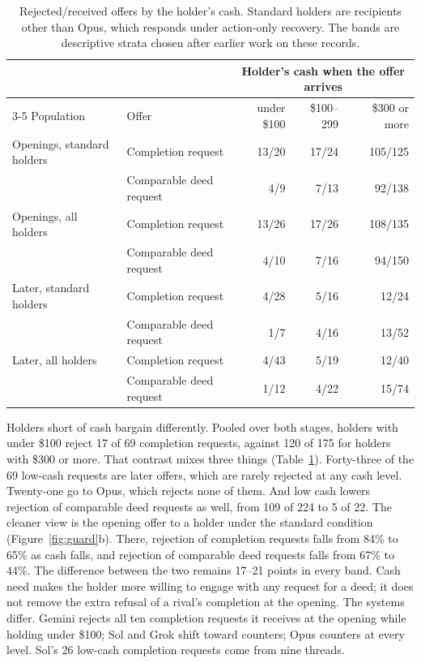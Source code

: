 \documentclass[11pt,letterpaper]{article}
\begin{document}
\begin{table}[t]
\centering\small
\begin{tabular}{@{}llrrr@{}}
\toprule
& & \multicolumn{3}{c}{Holder's cash when the offer arrives}\\
\cmidrule(l){3-5}
Population & Offer & under \$100 & \$100--299 & \$300 or more\\
\midrule
Openings, standard holders & Completion request & 13/20 & 17/24 & 105/125\\
& Comparable deed request & 4/9 & 7/13 & 92/138\\
Openings, all holders & Completion request & 13/26 & 17/26 & 108/135\\
& Comparable deed request & 4/10 & 7/16 & 94/150\\
\addlinespace
Later, standard holders & Completion request & 4/28 & 5/16 & 12/24\\
& Comparable deed request & 1/7 & 4/16 & 13/52\\
Later, all holders & Completion request & 4/43 & 5/19 & 12/40\\
& Comparable deed request & 1/12 & 4/22 & 15/74\\
\bottomrule
\end{tabular}
\caption{Rejected/received offers by the holder's cash. Standard holders are recipients other than Opus, which responds under action-only recovery. The bands are descriptive strata chosen after earlier work on these records.}
\label{tab:liquidity}
\end{table}

Holders short of cash bargain differently. Pooled over both stages, holders with under \$100 reject 17 of 69 completion requests, against 120 of 175 for holders with \$300 or more. That contrast mixes three things (Table~\ref{tab:liquidity}). Forty-three of the 69 low-cash requests are later offers, which are rarely rejected at any cash level. Twenty-one go to Opus, which rejects none of them. And low cash lowers rejection of comparable deed requests as well, from 109 of 224 to 5 of 22. The cleaner view is the opening offer to a holder under the standard condition (Figure~\ref{fig:guard}b). There, rejection of completion requests falls from 84\% to 65\% as cash falls, and rejection of comparable deed requests falls from 67\% to 44\%. The difference between the two remains 17--21 points in every band. Cash need makes the holder more willing to engage with any request for a deed; it does not remove the extra refusal of a rival's completion at the opening. The systems differ. Gemini rejects all ten completion requests it receives at the opening while holding under \$100; Sol and Grok shift toward counters; Opus counters at every level. Sol's 26 low-cash completion requests come from nine threads.
\end{document}
